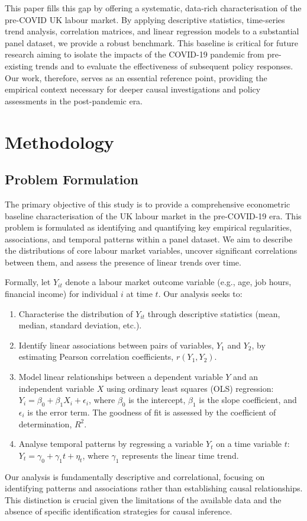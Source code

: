 \documentclass[11pt,a4paper]{article}
\begin{document}
This paper fills this gap by offering a systematic, data-rich characterisation of the pre-COVID UK labour market. By applying descriptive statistics, time-series trend analysis, correlation matrices, and linear regression models to a substantial panel dataset, we provide a robust benchmark. This baseline is critical for future research aiming to isolate the impacts of the COVID-19 pandemic from pre-existing trends and to evaluate the effectiveness of subsequent policy responses. Our work, therefore, serves as an essential reference point, providing the empirical context necessary for deeper causal investigations and policy assessments in the post-pandemic era.

\section{Methodology}

\subsection{Problem Formulation}

The primary objective of this study is to provide a comprehensive econometric baseline characterisation of the UK labour market in the pre-COVID-19 era. This problem is formulated as identifying and quantifying key empirical regularities, associations, and temporal patterns within a panel dataset. We aim to describe the distributions of core labour market variables, uncover significant correlations between them, and assess the presence of linear trends over time.

Formally, let $Y_{it}$ denote a labour market outcome variable (e.g., age, job hours, financial income) for individual $i$ at time $t$. Our analysis seeks to:
\begin{enumerate}
    \item Characterise the distribution of $Y_{it}$ through descriptive statistics (mean, median, standard deviation, etc.).
    \item Identify linear associations between pairs of variables, $Y_1$ and $Y_2$, by estimating Pearson correlation coefficients, $r(Y_1, Y_2)$.
    \item Model linear relationships between a dependent variable $Y$ and an independent variable $X$ using ordinary least squares (OLS) regression: $Y_i = \beta_0 + \beta_1 X_i + \epsilon_i$, where $\beta_0$ is the intercept, $\beta_1$ is the slope coefficient, and $\epsilon_i$ is the error term. The goodness of fit is assessed by the coefficient of determination, $R^2$.
    \item Analyse temporal patterns by regressing a variable $Y_t$ on a time variable $t$: $Y_t = \gamma_0 + \gamma_1 t + \eta_t$, where $\gamma_1$ represents the linear time trend.
\end{enumerate}
Our analysis is fundamentally descriptive and correlational, focusing on identifying patterns and associations rather than establishing causal relationships. This distinction is crucial given the limitations of the available data and the absence of specific identification strategies for causal inference.
\end{document}
